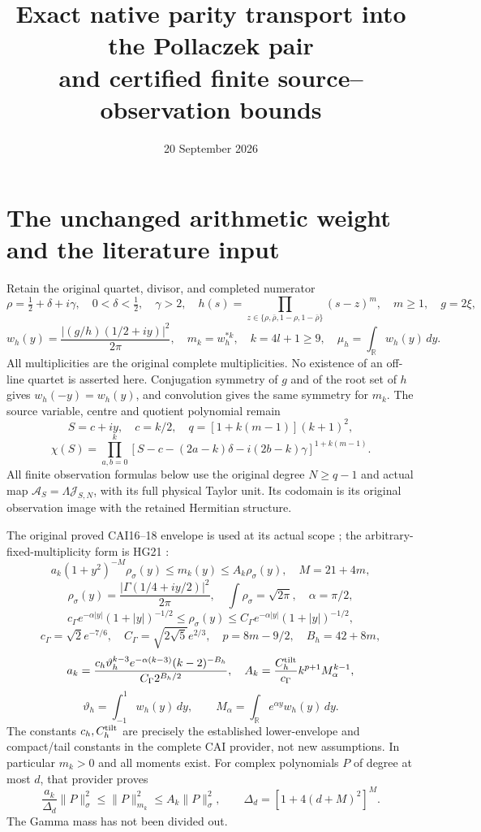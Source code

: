 \documentclass[11pt]{article}
\title{Exact native parity transport into the Pollaczek pair\\
and certified finite source--observation bounds}
\author{}
\date{20 September 2026}
\newcommand{\R}{\mathbb R}
\begin{document}
\maketitle

\section{The unchanged arithmetic weight and the literature input}

Retain the original quartet, divisor, and completed numerator
\[
 \rho=\tfrac12+\delta+i\gamma,\quad 0<\delta<\tfrac12,\quad\gamma>2,
 \quad h(s)=\prod_{z\in\{\rho,\bar\rho,1-\rho,1-\bar\rho\}}(s-z)^m,
 \quad m\geq1,\quad g=2\xi,
\]
\[
 w_h(y)=\frac{|(g/h)(1/2+iy)|^2}{2\pi},\quad
 m_k=w_h^{*k},\quad k=4l+1\geq9,\quad
 \mu_h=\int_\R w_h(y)\,dy.
\]
All multiplicities are the original complete multiplicities. No
existence of an off-line quartet is asserted here. Conjugation
symmetry of $g$ and of the root set of $h$ gives $w_h(-y)=w_h(y)$,
and convolution gives the same symmetry for $m_k$.
The source variable, centre and quotient polynomial remain
\[
 S=c+iy,\quad c=k/2,\quad q=[1+k(m-1)](k+1)^2,
\]
\[
 \chi(S)=\prod_{a,b=0}^k
 [S-c-(2a-k)\delta-i(2b-k)\gamma]^{1+k(m-1)}.
\]
All finite observation formulas below use the original degree
$N\geq q-1$ and actual map $\mathcal A_S=\Lambda\mathcal J_{S,N}$,
with its full physical Taylor unit. Its codomain is its original
observation image with the retained Hermitian structure.

The original proved CAI16--18 envelope is used at its actual scope
\cite{CAI}; the arbitrary-fixed-multiplicity form is HG21 \cite{HG}:
\begin{equation}\label{eq:CAI}
 a_k(1+y^2)^{-M}\rho_\sigma(y)\leq m_k(y)\leq A_k\rho_\sigma(y),
 \quad M=21+4m,
\end{equation}
\[
 \rho_\sigma(y)=\frac{|\Gamma(1/4+iy/2)|^2}{2\pi},\quad
 \int\rho_\sigma=\sqrt{2\pi},\quad\alpha=\pi/2,
\]
\[
 c_\Gamma e^{-\alpha|y|}(1+|y|)^{-1/2}
 \leq\rho_\sigma(y)\leq
 C_\Gamma e^{-\alpha|y|}(1+|y|)^{-1/2},
\]
\[
 c_\Gamma=\sqrt2e^{-7/6},\quad C_\Gamma=\sqrt{2\sqrt5}e^{2/3},
 \quad p=8m-9/2,\quad B_h=42+8m,
\]
\[
 a_k=\frac{c_h\vartheta_h^{k-3}e^{-\alpha(k-3)}(k-2)^{-B_h}}
                   {C_\Gamma2^{B_h/2}},\quad
 A_k=\frac{C_h^{\rm tilt}}{c_\Gamma}k^{p+1}M_\alpha^{k-1},
\]
\[
 \vartheta_h=\int_{-1}^1w_h(y)\,dy,\qquad
 M_\alpha=\int_\R e^{\alpha y}w_h(y)\,dy.
\]
The constants $c_h,C_h^{\rm tilt}$ are precisely the established
lower-envelope and compact/tail constants in the complete CAI
provider, not new assumptions. In particular $m_k>0$ and all
moments exist. For complex polynomials $P$ of degree at most $d$,
that provider proves
\begin{equation}\label{eq:CAI-finite}
 \frac{a_k}{\Delta_d}\|P\|_\sigma^2
       \leq\|P\|_{m_k}^2\leq A_k\|P\|_\sigma^2,
 \qquad \Delta_d=[1+4(d+M)^2]^M.
\end{equation}
The Gamma mass has not been divided out.
\end{document}
